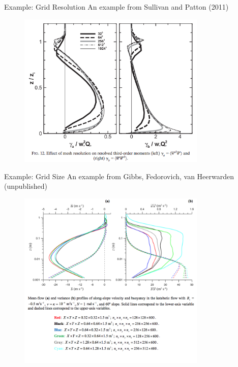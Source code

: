 \begin{frame}{Example: Grid Resolution}
An example from Sullivan and Patton (2011) 
\begin{figure}
\includegraphics[width=0.8\textwidth]{compare20}
\end{figure}
\end{frame}
\begin{frame}{Example: Grid Size}
An example from Gibbs, Fedorovich, van Heerwarden (unpublished)
\begin{figure}
\includegraphics[width=0.8\textwidth]{compare21}
\end{figure}
\end{frame}
